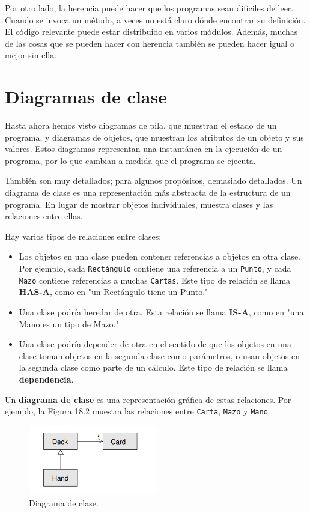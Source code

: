 Por otro lado, la herencia puede hacer que los programas sean difíciles de leer. Cuando se invoca un método, a veces no está claro dónde encontrar su definición. El código relevante puede estar distribuido en varios módulos. Además, muchas de las cosas que se pueden hacer con herencia también se pueden hacer igual o mejor sin ella.

\section{Diagramas de clase}

Hasta ahora hemos visto diagramas de pila, que muestran el estado de un programa, y diagramas de objetos, que muestran los atributos de un objeto y sus valores. Estos diagramas representan una instantánea en la ejecución de un programa, por lo que cambian a medida que el programa se ejecuta.

También son muy detallados; para algunos propósitos, demasiado detallados. Un diagrama de clase es una representación más abstracta de la estructura de un programa. En lugar de mostrar objetos individuales, muestra clases y las relaciones entre ellas.

Hay varios tipos de relaciones entre clases:

\begin{itemize}
    \item Los objetos en una clase pueden contener referencias a objetos en otra clase. Por ejemplo, cada \texttt{Rectángulo} contiene una referencia a un \texttt{Punto}, y cada \texttt{Mazo} contiene referencias a muchas \texttt{Cartas}. Este tipo de relación se llama \textbf{HAS-A}, como en "un Rectángulo tiene un Punto."
    \item Una clase podría heredar de otra. Esta relación se llama \textbf{IS-A}, como en "una Mano es un tipo de Mazo."
    \item Una clase podría depender de otra en el sentido de que los objetos en una clase toman objetos en la segunda clase como parámetros, o usan objetos en la segunda clase como parte de un cálculo. Este tipo de relación se llama \textbf{dependencia}.
\end{itemize}

Un \textbf{diagrama de clase} es una representación gráfica de estas relaciones. Por ejemplo, la Figura 18.2 muestra las relaciones entre \texttt{Carta}, \texttt{Mazo} y \texttt{Mano}.

\begin{figure}[h]
\centering
\includegraphics[width=0.5\textwidth]{./images/chapter_18_2.png}
\caption{Diagrama de clase.}
\label{fig:class_diagram}
\end{figure}

